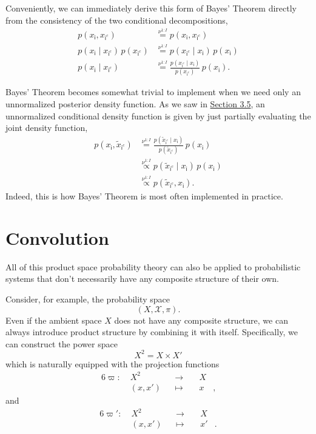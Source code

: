 \documentclass[
  letterpaper,
  DIV=11,
  numbers=noendperiod]{scrartcl}
\begin{document}
Conveniently, we can immediately derive this form of Bayes' Theorem
directly from the consistency of the two conditional decompositions,
\begin{align*}
p( x_{\mathsf{i}}, x_{ \mathsf{i}^{c} } )
&\overset{ \nu^{1:I} }{=}
p( x_{\mathsf{i}}, x_{ \mathsf{i}^{c} } )
\\
p( x_{\mathsf{i}} \mid x_{ \mathsf{i}^{c} } ) \,
p( x_{ \mathsf{i}^{c} } )
&\overset{ \nu^{1:I} }{=}
p( x_{ \mathsf{i}^{c} } \mid x_{\mathsf{i}}) \,
p( x_{ \mathsf{i} } )
\\
p( x_{\mathsf{i}} \mid x_{ \mathsf{i}^{c} } )
&\overset{ \nu^{1:I} }{=}
\frac{
  p( x_{ \mathsf{i}^{c} } \mid x_{\mathsf{i}})
}{
  p( x_{ \mathsf{i}^{c} } )
} \,
p( x_{ \mathsf{i} } ).
\end{align*}

Bayes' Theorem becomes somewhat trivial to implement when we need only
an unnormalized posterior density function. As we saw in
\hyperref[sec:cond-part-eval]{Section 3.5}, an unnormalized conditional
density function is given by just partially evaluating the joint density
function, \begin{align*}
p( x_{\mathsf{i}}, \tilde{x}_{ \mathsf{i}^{c} } )
&\overset{ \nu^{1:I} }{=}
\frac{
  p( \tilde{x}_{ \mathsf{i}^{c} } \mid x_{\mathsf{i}})
}{
  p( \tilde{x}_{ \mathsf{i}^{c} } )
} \,
p( x_{ \mathsf{i} } )
\\
&\overset{ \nu^{1:I} }{ \propto }
p( \tilde{x}_{ \mathsf{i}^{c} } \mid x_{\mathsf{i}}) \,
p( x_{ \mathsf{i} } )
\\
&\overset{ \nu^{1:I} }{ \propto }
p( \tilde{x}_{ \mathsf{i}^{c} } , x_{\mathsf{i}} ).
\end{align*} Indeed, this is how Bayes' Theorem is most often
implemented in practice.

\section{Convolution}\label{convolution}

All of this product space probability theory can also be applied to
probabilistic systems that don't necessarily have any composite
structure of their own.

Consider, for example, the probability space \[
(X, \mathcal{X}, \pi).
\] Even if the ambient space \(X\) does not have any composite
structure, we can always introduce product structure by combining it
with itself. Specifically, we can construct the power space \[
X^{2} = X \times X'
\] which is naturally equipped with the projection functions
\begin{alignat*}{6}
\varpi :\; & X^{2} & &\rightarrow& \; & X &
\\
& (x, x') & &\mapsto& & x &,
\end{alignat*} and \begin{alignat*}{6}
\varpi' :\; & X^{2} & &\rightarrow& \; & X &
\\
& (x, x') & &\mapsto& & x' &.
\end{alignat*}
\end{document}
